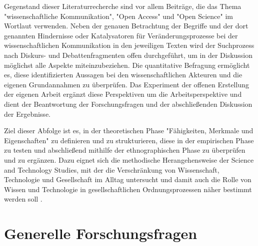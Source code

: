 Gegenstand dieser Literaturrecherche sind vor allem Beiträge, die das Thema "wissenschaftliche Kommunikation", "Open Access" und "Open Science" im Wortlaut verwenden. Neben der genauen Betrachtung der Begriffe und der dort genannten Hindernisse oder Katalysatoren für Veränderungsprozesse bei der wissenschaftlichen Kommunikation in den jeweiligen Texten wird der Suchprozess nach Diskurs- und Debattenfragmenten offen durchgeführt, um in der Diskussion möglichst alle Aspekte miteinzubeziehen. Die quantitative Befragung ermöglicht es, diese identifizierten Aussagen bei den wissenschaftlichen Akteuren und die eigenen Grundannahmen zu überprüfen. Das Experiment der offenen Erstellung der eigenen Arbeit ergänzt diese Perspektiven um die Arbeitsperspektive und dient der Beantwortung der Forschungsfragen und der abschließenden Diskussion der Ergebnisse.

Ziel dieser Abfolge ist es, in der theoretischen Phase "Fähigkeiten, Merkmale und Eigenschaften" \cite{Raab-Steiner_2012} zu definieren und zu strukturieren, diese in der empirischen Phase zu testen und abschließend mithilfe der ethnographischen Phase zu überprüfen und zu ergänzen. Dazu eignet sich die methodische Herangehensweise der Science and Technology Studies, mit der die Verschränkung von Wissenschaft, Technologie und Gesellschaft im Alltag untersucht und damit auch die Rolle von Wissen und Technologie in gesellschaftlichen Ordnungsprozessen näher bestimmt werden soll \cite{Beck_2014}.

\section{Generelle Forschungsfragen}

